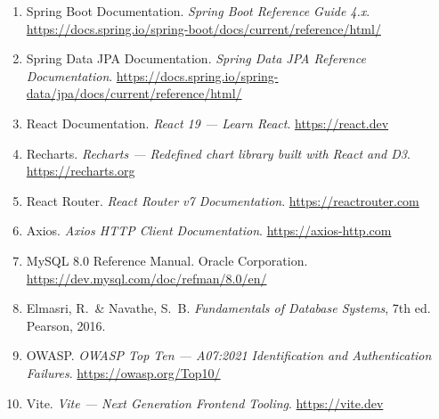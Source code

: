 \documentclass[12pt,a4paper]{article}
\begin{document}
\begin{enumerate}
    \item Spring Boot Documentation. \textit{Spring Boot Reference Guide 4.x}.
          \url{https://docs.spring.io/spring-boot/docs/current/reference/html/}

    \item Spring Data JPA Documentation. \textit{Spring Data JPA Reference
          Documentation}.
          \url{https://docs.spring.io/spring-data/jpa/docs/current/reference/html/}

    \item React Documentation. \textit{React 19 --- Learn React}.
          \url{https://react.dev}

    \item Recharts. \textit{Recharts --- Redefined chart library built with React
          and D3}. \url{https://recharts.org}

    \item React Router. \textit{React Router v7 Documentation}.
          \url{https://reactrouter.com}

    \item Axios. \textit{Axios HTTP Client Documentation}.
          \url{https://axios-http.com}

    \item MySQL 8.0 Reference Manual. Oracle Corporation.
          \url{https://dev.mysql.com/doc/refman/8.0/en/}

    \item Elmasri, R.\ \& Navathe, S.\ B\@. \textit{Fundamentals of Database
          Systems}, 7th ed. Pearson, 2016.

    \item OWASP\@. \textit{OWASP Top Ten --- A07:2021 Identification and
          Authentication Failures}. \url{https://owasp.org/Top10/}

    \item Vite. \textit{Vite --- Next Generation Frontend Tooling}.
          \url{https://vite.dev}
\end{enumerate}
\end{document}
